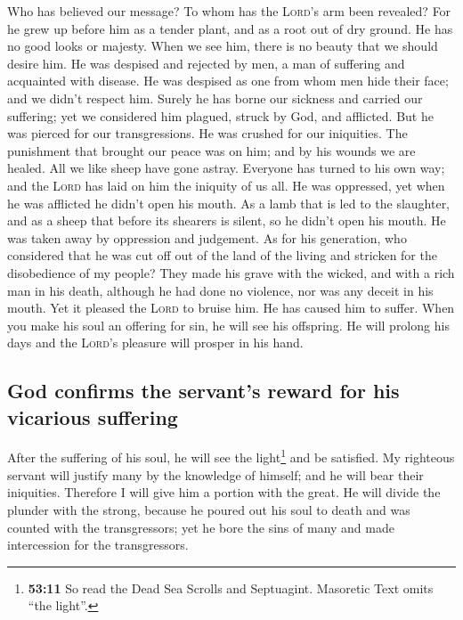  Who has believed our message? To whom has the
\textsc{Lord}'s arm been revealed?  For he grew up before
him as a tender plant, and as a root out of dry ground. He has no good
looks or majesty. When we see him, there is no beauty that we should
desire him.  He was despised and rejected by men, a man of
suffering and acquainted with disease. He was despised as one from whom
men hide their face; and we didn't respect him.  Surely he
has borne our sickness and carried our suffering; yet we considered him
plagued, struck by God, and afflicted.  But he was pierced
for our transgressions. He was crushed for our iniquities. The
punishment that brought our peace was on him; and by his wounds we are
healed.  All we like sheep have gone astray. Everyone has
turned to his own way; and the \textsc{Lord} has laid on him the
iniquity of us all.  He was oppressed, yet when he was
afflicted he didn't open his mouth. As a lamb that is led to the
slaughter, and as a sheep that before its shearers is silent, so he
didn't open his mouth.  He was taken away by oppression
and judgement. As for his generation, who considered that he was cut off
out of the land of the living and stricken for the disobedience of my
people?  They made his grave with the wicked, and with a
rich man in his death, although he had done no violence, nor was any
deceit in his mouth.  Yet it pleased the \textsc{Lord} to
bruise him. He has caused him to suffer. When you make his soul an
offering for sin, he will see his offspring. He will prolong his days
and the \textsc{Lord}'s pleasure will prosper in his hand.

\hypertarget{god-confirms-the-servants-reward-for-his-vicarious-suffering}{%
\subsection{God confirms the servant's reward for his vicarious
suffering}\label{god-confirms-the-servants-reward-for-his-vicarious-suffering}}

 After the suffering of his soul, he will see the
light\footnote{\textbf{53:11} So read the Dead Sea Scrolls and
  Septuagint. Masoretic Text omits ``the light''.} and be satisfied. My
righteous servant will justify many by the knowledge of himself; and he
will bear their iniquities.  Therefore I will give him a
portion with the great. He will divide the plunder with the strong,
because he poured out his soul to death and was counted with the
transgressors; yet he bore the sins of many and made intercession for
the transgressors.

